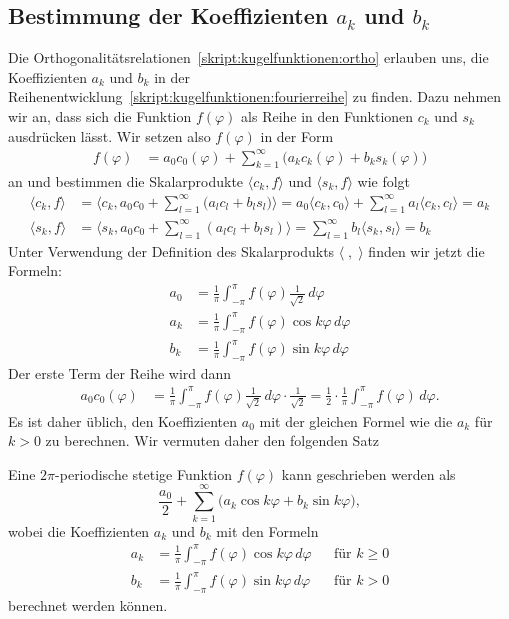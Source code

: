 \subsection{Bestimmung der Koeffizienten $a_k$ und $b_k$}
Die Orthogonalitätsrelationen~\eqref{skript:kugelfunktionen:ortho} erlauben
uns, die Koeffizienten $a_k$ und $b_k$ in der
Reihenentwicklung~\eqref{skript:kugelfunktionen:fourierreihe}
zu finden.
Dazu nehmen wir an, dass sich die Funktion $f(\varphi)$ als Reihe
in den Funktionen $c_k$ und $s_k$ ausdrücken lässt.
Wir setzen also $f(\varphi)$ in der Form
\begin{align*}
f(\varphi)
&=
a_0 c_0(\varphi)
+
\sum_{k=1}^\infty \bigl(a_kc_k(\varphi) + b_ks_k(\varphi)\bigr)
\end{align*}
an und bestimmen die Skalarprodukte
$\langle c_k,f\rangle$ und
$\langle s_k,f\rangle$ wie folgt
\begin{align*}
\langle c_k,f\rangle
&=
\biggl\langle
c_k,
a_0 c_0+\sum_{l=1}^\infty\bigl(a_l c_l + b_l s_l\bigr)
\biggr\rangle
=
a_0\langle c_k,c_0\rangle
+
\sum_{l=1}^\infty a_l\langle c_k,c_l\rangle
=
a_k
\\
\langle s_k,f\rangle
&=
\biggl\langle
s_k,
a_0c_0+\sum_{l=1}^\infty (a_lc_l+b_ls_l)
\biggr\rangle
=
\sum_{l=1}^\infty b_l\langle s_k,s_l\rangle
=
b_k
\end{align*}
Unter Verwendung der Definition des Skalarprodukts $\langle\;,\;\rangle$
finden wir jetzt die Formeln:
\begin{align*}
a_0
&=
\frac1{\pi}\int_{-\pi}^{\pi} f(\varphi)\frac1{\sqrt{2}}\,d\varphi
\\
a_k
&=
\frac1{\pi}\int_{-\pi}^{\pi} f(\varphi)\cos k\varphi\,d\varphi
\\
b_k
&=
\frac1{\pi}\int_{-\pi}^{\pi} f(\varphi)\sin k\varphi\,d\varphi
\end{align*}
Der erste Term der Reihe wird dann
\begin{align*}
a_0c_0(\varphi)
&=
\frac1{\pi}\int_{-\pi}^{\pi} f(\varphi)\frac1{\sqrt{2}}\,d\varphi
\cdot
\frac1{\sqrt{2}}
=
\frac12
\cdot
\frac1{\pi}\int_{-\pi}^{\pi} f(\varphi) \,d\varphi.
\end{align*}
Es ist daher üblich, den Koeffizienten $a_0$ mit der gleichen
Formel wie die $a_k$ für $k>0$ zu berechnen.
Wir vermuten daher den folgenden Satz
\begin{satz}
Eine $2\pi$-periodische stetige Funktion $f(\varphi)$ kann geschrieben
werden als
\begin{equation}
\frac{a_0}2
+
\sum_{k=1}^\infty\bigl(
a_k\cos k\varphi + b_k\sin k\varphi
\bigr),
\label{skript:kugelfuntionen:satz:reihe}
\end{equation}
wobei die Koeffizienten $a_k$ und $b_k$ mit den Formeln
\begin{equation}
\begin{aligned}
a_k
&=
\frac1{\pi}
\int_{-\pi}^\pi f(\varphi)\cos k\varphi\,d\varphi
&
&\text{für $k\ge 0$}
\\
b_k
&=
\frac1{\pi}
\int_{-\pi}^\pi f(\varphi)\sin k\varphi\,d\varphi
&
&\text{für $k>0$}
\end{aligned}
\label{skript:kugelfuntionen:satz:koeffizienten}
\end{equation}
berechnet werden können.
\end{satz}

